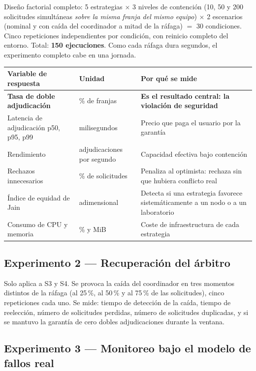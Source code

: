 \documentclass[11pt,a4paper]{article}
\begin{document}
Diseño factorial completo: 5 estrategias $\times$ 3 niveles de contención (10, 50 y 200 solicitudes simultáneas \emph{sobre la misma franja del mismo equipo}) $\times$ 2 escenarios (nominal y con caída del coordinador a mitad de la ráfaga) $=$ 30 condiciones. Cinco repeticiones independientes por condición, con reinicio completo del entorno. Total: \textbf{150 ejecuciones}. Como cada ráfaga dura segundos, el experimento completo cabe en una jornada.

\begin{center}
	\small
	\begin{tabular}{@{}p{5.4cm}p{3.2cm}p{6.4cm}@{}}
		\toprule
		\textbf{Variable de respuesta} & \textbf{Unidad} & \textbf{Por qué se mide} \\
		\midrule
		\textbf{Tasa de doble adjudicación} & \% de franjas & \textbf{Es el resultado central: la violación de seguridad} \\
		Latencia de adjudicación p50, p95, p99 & milisegundos & Precio que paga el usuario por la garantía \\
		Rendimiento & adjudicaciones por segundo & Capacidad efectiva bajo contención \\
		Rechazos innecesarios & \% de solicitudes & Penaliza al optimista: rechaza sin que hubiera conflicto real \\
		Índice de equidad de Jain & adimensional & Detecta si una estrategia favorece sistemáticamente a un nodo o a un laboratorio \\
		Consumo de CPU y memoria & \% y MiB & Coste de infraestructura de cada estrategia \\
		\bottomrule
	\end{tabular}
\end{center}

\subsection{Experimento 2 --- Recuperación del árbitro}

Solo aplica a S3 y S4. Se provoca la caída del coordinador en tres momentos distintos de la ráfaga (al 25\,\%, al 50\,\% y al 75\,\% de las solicitudes), cinco repeticiones cada uno. Se mide: tiempo de detección de la caída, tiempo de reelección, número de solicitudes perdidas, número de solicitudes duplicadas, y si se mantuvo la garantía de cero dobles adjudicaciones durante la ventana.

\subsection{Experimento 3 --- Monitoreo bajo el modelo de fallos real}
\end{document}
